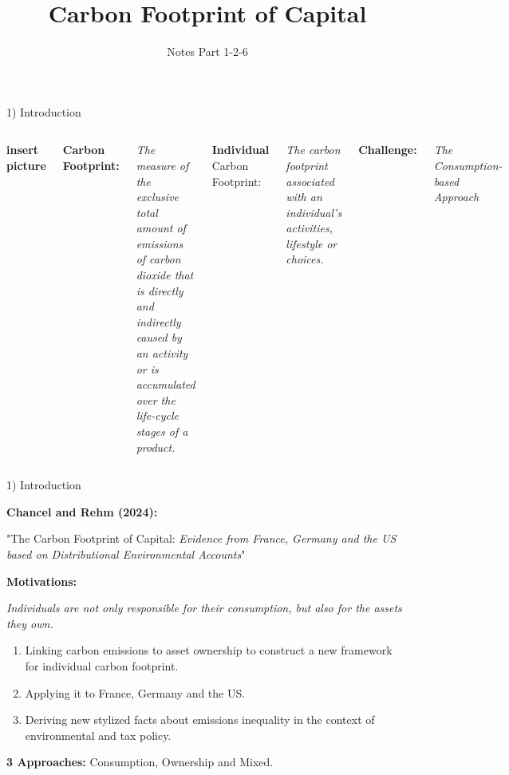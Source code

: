 \documentclass[10pt]{beamer}
\title{Carbon Footprint of Capital}
\subtitle{Notes Part 1-2-6}
\date{}
\institute{Topics - Fall 2024}
\begin{document}
\maketitle


\begin{frame}{1) Introduction}

    \begin{columns}[t]
        \textbf{insert picture}
        
        \textbf{Carbon Footprint:}
        
        \textit{The measure of the exclusive total amount of emissions of carbon dioxide that is directly and indirectly caused by an activity or is accumulated over the life-cycle stages of a product.}
        
        \vspace{10pt}
        \textbf{Individual} Carbon Footprint:

        \textit{The carbon footprint associated with an individual’s activities, lifestyle or choices.}

        \vspace{10pt}
        \textbf{Challenge:} 

        \vspace{10pt}
        \textit{The Consumption-based Approach}
        
    \end{columns}

\end{frame}

\begin{frame}{1) Introduction}



\begin{center}
\textbf{Chancel and Rehm (2024):}

"The Carbon Footprint of Capital: 
\textit{Evidence from France, Germany and the US based on Distributional Environmental Accounts}"
\end{center}

\textbf{Motivations:}

\textit{Individuals are not only responsible for their consumption, but also for the assets they own.}

    \begin{enumerate}
        \item Linking carbon emissions to asset ownership to construct a new framework for individual carbon footprint.
        \item Applying it to France, Germany and the US.
        \item Deriving new stylized facts about emissions inequality in the context of environmental and tax policy.
    \end{enumerate}
    
 \item \textbf{3 Approaches:} Consumption, Ownership and Mixed.

\end{frame}
\end{document}
